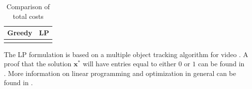 \documentclass[letterpaper,12pt]{report}
\begin{document}
\begin{table}
    \caption{\label{tab:greedy_lp_cost_compare} Comparison of total costs}
    \begin{center}
        \begin{tabular}{c c}
            Greedy & LP \\
            \hline
             &
             \\
        \end{tabular}
    \end{center}
\end{table}

The LP formulation is based on a multiple object tracking algorithm for video
\cite{jiang2007linear}. A proof that the solution $\boldsymbol{x}^{\ast}$ will
have entries equal to either $0$ or $1$ can be found in
\cite[p.~167]{parker1988discrete}. More information on linear programming and
optimization in general can be found in \cite{boyd2004convex}.




\end{document}
